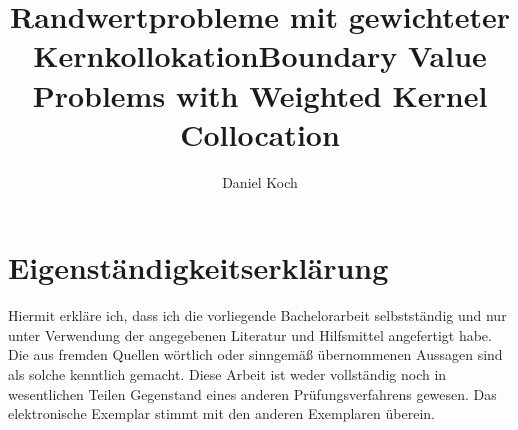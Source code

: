 \documentclass[%
  bachelor,%
  english,%
  ngerman,%
  male,%
  final,
]{iswstud}
\author{Daniel Koch}
\date{\printdate{2018-10-05}}
\title{Randwertprobleme mit gewichteter Kernkollokation}
\theoremstyle{plain}
\theoremstyle{definition}
\theoremstyle{definition}
\theoremstyle{remark}
\begin{document}
\frontmatter

\coverpage

\maketitle



\begin{otherlanguage}{english}
  \title{Boundary Value Problems with Weighted Kernel Collocation}
  \shorttitle{}
  \subtitle{}

  \maketitle
\end{otherlanguage}


\chapter*{Eigenständigkeitserklärung}
Hiermit erkläre ich, dass ich die vorliegende Bachelorarbeit selbstständig und nur unter Verwendung der angegebenen Literatur und Hilfsmittel angefertigt habe. Die aus
fremden Quellen wörtlich oder sinngemäß übernommenen Aussagen sind als solche kenntlich gemacht.
Diese Arbeit ist weder vollständig noch in wesentlichen Teilen Gegenstand
eines anderen Prüfungsverfahrens gewesen.
Das elektronische Exemplar stimmt mit den anderen Exemplaren überein.
\end{document}
